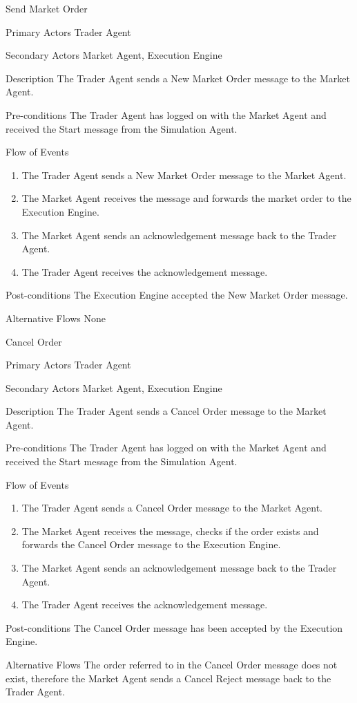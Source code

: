 \begin{usecase}{Send Market Order}
\item[Primary Actors] Trader Agent
\item[Secondary Actors] Market Agent, Execution Engine
\item[Description] The Trader Agent sends a New Market Order message to the Market Agent.
\item[Pre-conditions] The Trader Agent has logged on with the Market Agent and received the Start message from the Simulation Agent.
\item[Flow of Events] 
\begin{enumerate}
\item The Trader Agent sends a New Market Order message to the Market Agent.
\item The Market Agent receives the message and forwards the market order to the Execution Engine.
\item The Market Agent sends an acknowledgement message back to the Trader Agent.
\item The Trader Agent receives the acknowledgement message.
\end{enumerate}
\item[Post-conditions] The Execution Engine accepted the New Market Order message.
\item[Alternative Flows] None
\end{usecase}

\begin{usecase}{Cancel Order}
\item[Primary Actors] Trader Agent
\item[Secondary Actors] Market Agent, Execution Engine
\item[Description] The Trader Agent sends a Cancel Order message to the Market Agent.
\item[Pre-conditions] The Trader Agent has logged on with the Market Agent and received the Start message from the Simulation Agent.
\item[Flow of Events] 
\begin{enumerate}
\item The Trader Agent sends a Cancel Order message to the Market Agent.
\item The Market Agent receives the message, checks if the order exists and forwards the Cancel Order message to the Execution Engine.
\item The Market Agent sends an acknowledgement message back to the Trader Agent.
\item The Trader Agent receives the acknowledgement message.
\end{enumerate}
\item[Post-conditions] The Cancel Order message has been accepted by the Execution Engine.
\item[Alternative Flows] The order referred to in the Cancel Order message does not exist, therefore the Market Agent sends a Cancel Reject message back to the Trader Agent.
\end{usecase}

